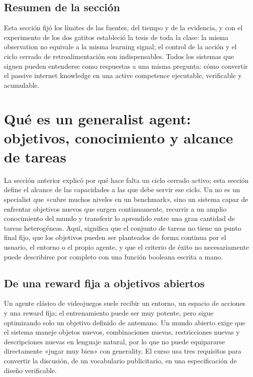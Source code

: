 \documentclass[a4paper]{article}
\begin{document}
\subsection{Resumen de la sección}

Esta sección fijó los límites de las fuentes, del tiempo y de la evidencia, y con el experimento de los dos gatitos estableció la tesis de toda la clase: la misma observation no equivale a la misma learning signal; el control de la acción y el ciclo cerrado de retroalimentación son indispensables. Todos los sistemas que siguen pueden entenderse como respuestas a una misma pregunta: cómo convertir el passive internet knowledge en una active competence ejecutable, verificable y acumulable.
\section{Qué es un generalist agent: objetivos, conocimiento y alcance de tareas}

La sección anterior explicó por qué hace falta un ciclo cerrado activo; esta sección define el alcance de las capacidades a las que debe servir ese ciclo. Un  no es un specialist que «cubre muchos niveles en un benchmark», sino un sistema capaz de enfrentar objetivos nuevos que surgen continuamente, recurrir a un amplio conocimiento del mundo y transferir lo aprendido entre una gran cantidad de tareas heterogéneas. Aquí,  significa que el conjunto de tareas no tiene un punto final fijo, que los objetivos pueden ser planteados de forma continua por el usuario, el entorno o el propio agente, y que el criterio de éxito no necesariamente puede describirse por completo con una función booleana escrita a mano.

\subsection{De una reward fija a objetivos abiertos}

Un agente clásico de videojuegos suele recibir un entorno, un espacio de acciones y una reward fija; el entrenamiento puede ser muy potente, pero sigue optimizando solo un objetivo definido de antemano. Un mundo abierto exige que el sistema maneje objetos nuevos, combinaciones nuevas, restricciones nuevas y descripciones nuevas en lenguaje natural, por lo que no puede equipararse directamente «jugar muy bien» con generality. El curso usa tres requisitos para convertir la discusión, de un vocabulario publicitario, en una especificación de diseño verificable.
\end{document}
